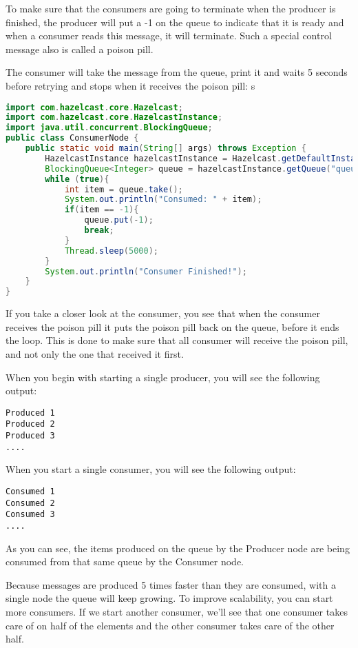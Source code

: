To make sure that the consumers are going to terminate when the producer is finished, the producer will put a -1 on the queue to indicate that it is ready and when a consumer reads this message, it will terminate. Such a special control message also is called a poison pill.

The consumer will take the message from the queue, print it and waits 5 seconds before retrying and stops when it receives the poison pill:
s\begin{lstlisting}[language=java]
import com.hazelcast.core.Hazelcast;
import com.hazelcast.core.HazelcastInstance;
import java.util.concurrent.BlockingQueue;
public class ConsumerNode {
    public static void main(String[] args) throws Exception {
        HazelcastInstance hazelcastInstance = Hazelcast.getDefaultInstance();
        BlockingQueue<Integer> queue = hazelcastInstance.getQueue("queue");
        while (true){
            int item = queue.take();
            System.out.println("Consumed: " + item);
            if(item == -1){
                queue.put(-1);
                break;
            }     
            Thread.sleep(5000);            
        }
        System.out.println("Consumer Finished!");
    }
}
\end{lstlisting}
If you take a closer look at the consumer, you see that when the consumer receives the poison pill it puts the poison pill back on the queue, before it ends the loop. This is done to make sure that all consumer will receive the poison pill, and not only the one that received it first.

When you begin with starting a single producer, you will see the following output:
\begin{verbatim}
Produced 1
Produced 2
Produced 3
....
\end{verbatim}

When you start a single consumer, you will see the following output:
\begin{verbatim}
Consumed 1
Consumed 2
Consumed 3
....
\end{verbatim}
As you can see, the items produced on the queue by the Producer node are being consumed from that same queue by the Consumer node.

Because messages are produced 5 times faster than they are consumed, with a single node the queue will keep growing. To improve scalability, you can start more consumers. If we start another consumer, we'll see that one consumer takes care of on half of the elements and the other consumer takes care of the other half.

